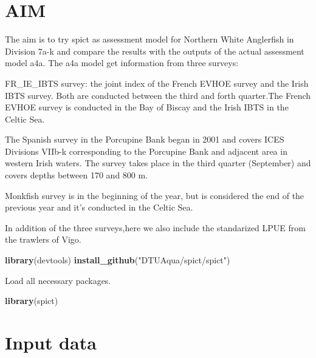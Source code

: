 \documentclass[
]{article}
\author{}
\date{\vspace{-2.5em}}
\newenvironment{Shaded}{\begin{snugshade}}{\end{snugshade}}
\newcommand{\KeywordTok}[1]{\textcolor[rgb]{0.13,0.29,0.53}{\textbf{#1}}}
\newcommand{\NormalTok}[1]{#1}
\newcommand{\StringTok}[1]{\textcolor[rgb]{0.31,0.60,0.02}{#1}}
\begin{document}
\addtolength{\headheight}{1.0cm} 
\pagestyle{fancyplain}

\renewcommand{\headrulewidth}{0pt}

\hypertarget{aim}{%
\section{AIM}\label{aim}}

The aim is to try spict as assessment model for Northern White
Anglerfish in Division 7a-k and compare the results with the outputs of
the actual assessment model a4a. The a4a model get information from
three surveys:

FR\_IE\_IBTS survey: the joint index of the French EVHOE survey and the
Irish IBTS survey. Both are conducted between the third and forth
quarter.The French EVHOE survey is conducted in the Bay of Biscay and
the Irish IBTS in the Celtic Sea.

The Spanish survey in the Porcupine Bank began in 2001 and covers ICES
Divisions VIIb-k corresponding to the Porcupine Bank and adjacent area
in western Irish waters. The survey takes place in the third quarter
(September) and covers depths between 170 and 800 m.

Monkfish survey is in the beginning of the year, but is considered the
end of the previous year and it's conducted in the Celtic Sea.

In addition of the three surveys,here we also include the standarized
LPUE from the trawlers of Vigo.

\begin{Shaded}
\begin{Highlighting}[]
\KeywordTok{library}\NormalTok{(devtools)}
\KeywordTok{install_github}\NormalTok{(}\StringTok{"DTUAqua/spict/spict"}\NormalTok{) }
\end{Highlighting}
\end{Shaded}

Load all necessary packages.

\begin{Shaded}
\begin{Highlighting}[]
\KeywordTok{library}\NormalTok{(spict)}
\end{Highlighting}
\end{Shaded}

\hypertarget{input-data}{%
\section{Input data}\label{input-data}}
\end{document}

